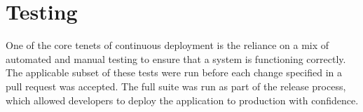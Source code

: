\chapter{Testing}
\par
One of the core tenets of continuous deployment is the reliance on a mix of automated and manual testing to ensure that a system is functioning correctly. The applicable subset of these tests were run before each change specified in a pull request was accepted. The full suite was run as part of the release process, which allowed developers to deploy the application to production with confidence.










